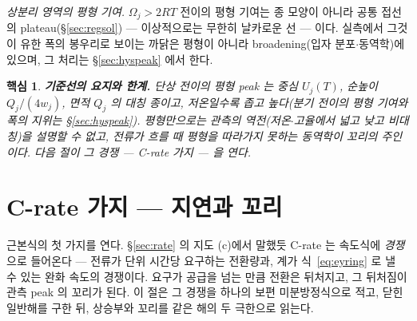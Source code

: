 \documentclass[11pt,a4paper]{article}
\newtheorem*{keybox}{핵심}
\begin{document}
\emph{상분리 영역의 평형 기여.} $\Omega_j>2RT$ 전이의 평형 기여는 종 모양이 아니라
공통 접선의 plateau(\S\ref{sec:regsol}) — 이상적으로는 무한히 날카로운 선 — 이다. 실측에서 그것이 유한
폭의 봉우리로 보이는 까닭은 평형이 아니라 broadening(입자 분포$\cdot$동역학)에 있으며, 그 처리는
\S\ref{sec:hyspeak} 에서 한다.

\begin{keybox}
\textbf{기준선의 요지와 한계.} 단상 전이의 평형 peak 는 중심 $U_j(T)$, 순높이 $Q_j/(4w_j)$, 면적
$Q_j$ 의 대칭 종이고, 저온일수록 좁고 높다(분기 전이의 평형 기여와 폭의 지위는 \S\ref{sec:hyspeak}). 평형만으로는 관측의 역전(저온$\cdot$고율에서 넓고 낮고 비대칭)을 설명할 수 없고, 전류가 흐를 때 평형을 따라가지 못하는 \emph{동역학}이 꼬리의 주인이다. 다음 절이 그 경쟁 —
C-rate 가지 — 을 연다.
\end{keybox}

\section{C-rate 가지 — 지연과 꼬리}\label{sec:lag}
근본식의 첫 가지를 연다. \S\ref{sec:rate} 의 지도 (c)에서 말했듯 C-rate 는 속도식에 \emph{경쟁}으로
들어온다 — 전류가 단위 시간당 요구하는 전환량과, 계가 식~\eqref{eq:eyring} 로 낼 수 있는 완화 속도의
경쟁이다. 요구가 공급을 넘는 만큼 전환은 뒤처지고, 그 뒤처짐이 관측 peak 의 꼬리가 된다. 이 절은 그 경쟁을
하나의 보편 미분방정식으로 적고, 닫힌 일반해를 구한 뒤, 상승부와 꼬리를 같은 해의 두 극한으로 읽는다.
\end{document}
